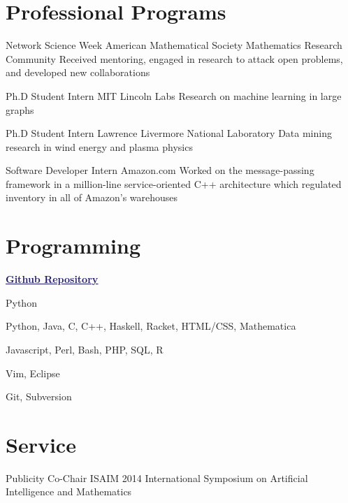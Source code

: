 \documentclass[11pt]{moderncv}
\begin{document}
   \section{Professional Programs}
         {Network Science Week}
      {American Mathematical Society Mathematics Research Community}
      {}
      {}
      {Received mentoring, engaged in research to attack open problems, and developed new collaborations}

         {Ph.D Student Intern}
      {MIT Lincoln Labs}
      {}
      {}
      {Research on machine learning in large graphs}

         {Ph.D Student Intern}
      {Lawrence Livermore National Laboratory}
      {}
      {}
      {Data mining research in wind energy and plasma physics}

         {Software Developer Intern}
      {Amazon.com}
      {}
      {}
      {Worked on the message-passing framework in a million-line service-oriented C++ architecture which regulated inventory in all of Amazon's warehouses}


   \section{Programming}
         {\href{https://github.com/j2kun/}{\textcolor{MidnightBlue}{\underline{\textbf{Github Repository}}}}}
      {}
{}
      {}
      {}

         {Python}
      {}
{}
      {}
      {}

         {Python, Java, C, C++, Haskell, Racket, HTML/CSS, Mathematica}
      {}
{}
      {}
      {}

         {Javascript, Perl, Bash, PHP, SQL, R}
      {}
{}
      {}
      {}

         {Vim, Eclipse}
      {}
{}
      {}
      {}

         {Git, Subversion}
      {}
{}
      {}
      {}


   \section{Service}
         {Publicity Co-Chair}
      {ISAIM 2014}
      {International Symposium on Artificial Intelligence and Mathematics}
      {}
{}
\end{document}
